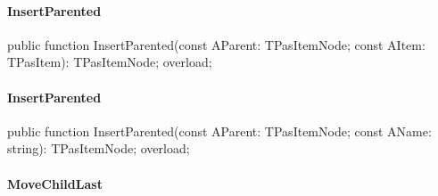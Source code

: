 \documentclass{report}
\newif\ifpdf
\begin{document}
\paragraph*{InsertParented}\hspace*{\fill}

\label{PasDoc_HierarchyTree.TStringCardinalTree-InsertParented}
\begin{list}{}{
\setlength{\itemindent}{0cm}
\setlength{\listparindent}{0cm}
\setlength{\leftmargin}{\evensidemargin}
\addtolength{\leftmargin}{\tmplength}
\settowidth{\labelsep}{X}
\addtolength{\leftmargin}{\labelsep}
\setlength{\labelwidth}{\tmplength}
}
\item[\textbf{Declaration}\hfill]
\ifpdf
\begin{flushleft}
\fi
\begin{ttfamily}
public function InsertParented(const AParent: TPasItemNode; const AItem: TPasItem): TPasItemNode; overload;\end{ttfamily}

\ifpdf
\end{flushleft}
\fi

\end{list}
\paragraph*{InsertParented}\hspace*{\fill}

\label{PasDoc_HierarchyTree.TStringCardinalTree-InsertParented}
\begin{list}{}{
\setlength{\itemindent}{0cm}
\setlength{\listparindent}{0cm}
\setlength{\leftmargin}{\evensidemargin}
\addtolength{\leftmargin}{\tmplength}
\settowidth{\labelsep}{X}
\addtolength{\leftmargin}{\labelsep}
\setlength{\labelwidth}{\tmplength}
}
\item[\textbf{Declaration}\hfill]
\ifpdf
\begin{flushleft}
\fi
\begin{ttfamily}
public function InsertParented(const AParent: TPasItemNode; const AName: string): TPasItemNode; overload;\end{ttfamily}

\ifpdf
\end{flushleft}
\fi

\end{list}
\paragraph*{MoveChildLast}\hspace*{\fill}
\end{document}
